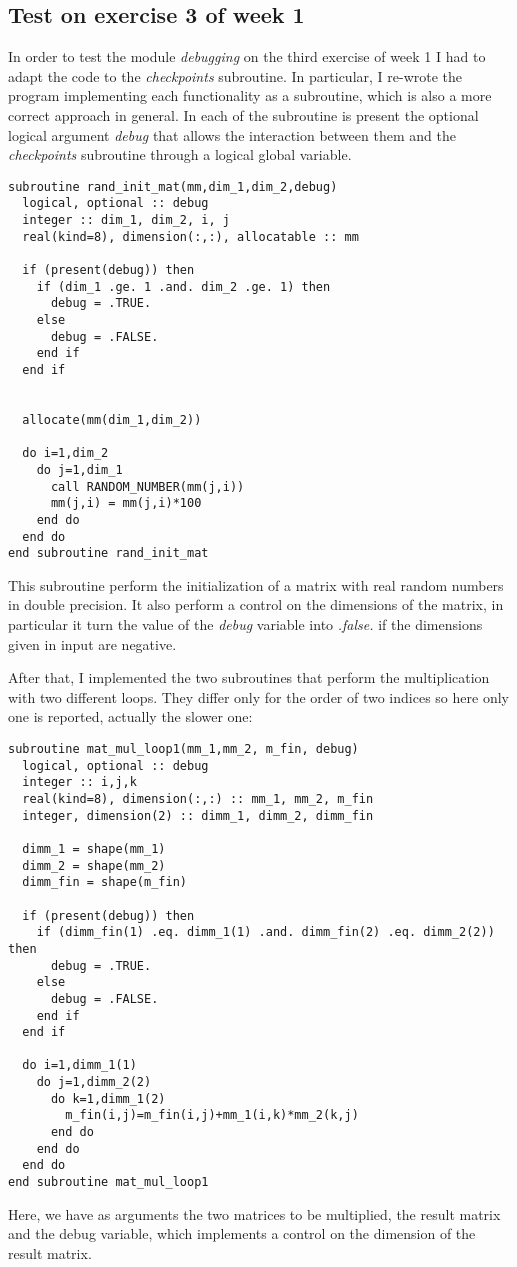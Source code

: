\documentclass[prb,9pt,notitlepage]{revtex4-1}
\begin{document}
\subsection{Test on exercise 3 of week 1}
In order to test the module \textit{debugging} on the third exercise of week 1 I had to adapt the code to the \textit{checkpoints} subroutine. In particular, I re-wrote the program implementing each functionality as a subroutine, which is also a more correct approach in general. In each of the subroutine is present the optional logical argument \textit{debug} that allows the interaction between them and the \textit{checkpoints} subroutine through a logical global variable.

\begin{lstlisting}
subroutine rand_init_mat(mm,dim_1,dim_2,debug)
  logical, optional :: debug
  integer :: dim_1, dim_2, i, j
  real(kind=8), dimension(:,:), allocatable :: mm

  if (present(debug)) then
    if (dim_1 .ge. 1 .and. dim_2 .ge. 1) then
      debug = .TRUE.
    else
      debug = .FALSE.
    end if
  end if


  allocate(mm(dim_1,dim_2))

  do i=1,dim_2
    do j=1,dim_1
      call RANDOM_NUMBER(mm(j,i))
      mm(j,i) = mm(j,i)*100
    end do
  end do
end subroutine rand_init_mat
\end{lstlisting}
This subroutine perform the initialization of a matrix with real random numbers in double precision. It also perform a control on the dimensions of the matrix, in particular it turn the value of the \textit{debug} variable into \textit{.false.} if the dimensions given in input are negative.

After that, I implemented the two subroutines that perform the multiplication with two different loops. They differ only for the order of two indices so here only one is reported, actually the slower one:
\begin{lstlisting}
subroutine mat_mul_loop1(mm_1,mm_2, m_fin, debug)
  logical, optional :: debug
  integer :: i,j,k
  real(kind=8), dimension(:,:) :: mm_1, mm_2, m_fin
  integer, dimension(2) :: dimm_1, dimm_2, dimm_fin

  dimm_1 = shape(mm_1)
  dimm_2 = shape(mm_2)
  dimm_fin = shape(m_fin)

  if (present(debug)) then
    if (dimm_fin(1) .eq. dimm_1(1) .and. dimm_fin(2) .eq. dimm_2(2)) then
      debug = .TRUE.
    else
      debug = .FALSE.
    end if
  end if

  do i=1,dimm_1(1)
    do j=1,dimm_2(2)
      do k=1,dimm_1(2)
        m_fin(i,j)=m_fin(i,j)+mm_1(i,k)*mm_2(k,j)
      end do
    end do
  end do
end subroutine mat_mul_loop1
\end{lstlisting}
Here, we have as arguments the two matrices to be multiplied, the result matrix and the debug variable, which implements a control on the dimension of the result matrix.
\end{document}
